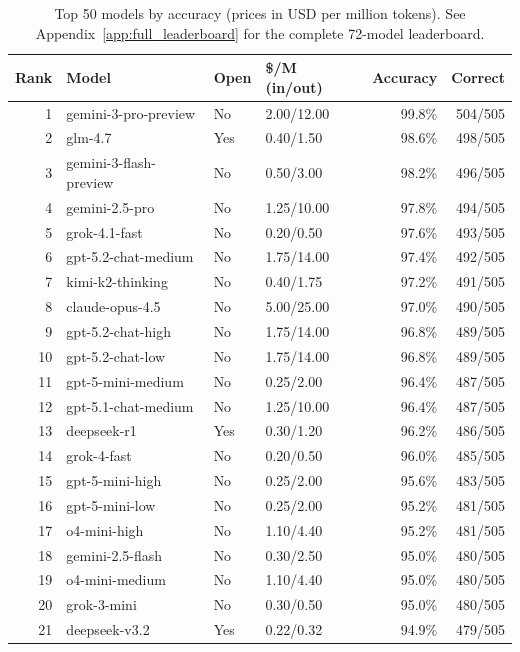 \documentclass[11pt]{article}
\begin{document}
\begin{table}[htbp]
  \centering
  \caption{Top 50 models by accuracy (prices in USD per million tokens). See Appendix~\ref{app:full_leaderboard} for the complete 72-model leaderboard.}
  \label{tab:leaderboard}
  \small
  \begin{tabular}{rlllrr}
    \toprule
    Rank & Model & Open & \$/M (in/out) & Accuracy & Correct \\
    \midrule
    1 & gemini-3-pro-preview & No & 2.00/12.00 & 99.8\% & 504/505 \\
    2 & glm-4.7 & \textcolor{openweight}{Yes} & 0.40/1.50 & 98.6\% & 498/505 \\
    3 & gemini-3-flash-preview & No & 0.50/3.00 & 98.2\% & 496/505 \\
    4 & gemini-2.5-pro & No & 1.25/10.00 & 97.8\% & 494/505 \\
    5 & grok-4.1-fast & No & 0.20/0.50 & 97.6\% & 493/505 \\
    6 & gpt-5.2-chat-medium & No & 1.75/14.00 & 97.4\% & 492/505 \\
    7 & kimi-k2-thinking & No & 0.40/1.75 & 97.2\% & 491/505 \\
    8 & claude-opus-4.5 & No & 5.00/25.00 & 97.0\% & 490/505 \\
    9 & gpt-5.2-chat-high & No & 1.75/14.00 & 96.8\% & 489/505 \\
    10 & gpt-5.2-chat-low & No & 1.75/14.00 & 96.8\% & 489/505 \\
    11 & gpt-5-mini-medium & No & 0.25/2.00 & 96.4\% & 487/505 \\
    12 & gpt-5.1-chat-medium & No & 1.25/10.00 & 96.4\% & 487/505 \\
    13 & deepseek-r1 & \textcolor{openweight}{Yes} & 0.30/1.20 & 96.2\% & 486/505 \\
    14 & grok-4-fast & No & 0.20/0.50 & 96.0\% & 485/505 \\
    15 & gpt-5-mini-high & No & 0.25/2.00 & 95.6\% & 483/505 \\
    16 & gpt-5-mini-low & No & 0.25/2.00 & 95.2\% & 481/505 \\
    17 & o4-mini-high & No & 1.10/4.40 & 95.2\% & 481/505 \\
    18 & gemini-2.5-flash & No & 0.30/2.50 & 95.0\% & 480/505 \\
    19 & o4-mini-medium & No & 1.10/4.40 & 95.0\% & 480/505 \\
    20 & grok-3-mini & No & 0.30/0.50 & 95.0\% & 480/505 \\
    21 & deepseek-v3.2 & \textcolor{openweight}{Yes} & 0.22/0.32 & 94.9\% & 479/505 \\

\end{tabular}
\end{table}
\end{document}
